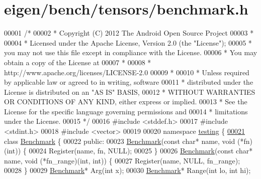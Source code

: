 \hypertarget{eigen_2bench_2tensors_2benchmark_8h_source}{}\section{eigen/bench/tensors/benchmark.h}
\label{eigen_2bench_2tensors_2benchmark_8h_source}

\begin{DoxyCode}
00001 \textcolor{comment}{/*}
00002 \textcolor{comment}{ * Copyright (C) 2012 The Android Open Source Project}
00003 \textcolor{comment}{ *}
00004 \textcolor{comment}{ * Licensed under the Apache License, Version 2.0 (the "License");}
00005 \textcolor{comment}{ * you may not use this file except in compliance with the License.}
00006 \textcolor{comment}{ * You may obtain a copy of the License at}
00007 \textcolor{comment}{ *}
00008 \textcolor{comment}{ *      http://www.apache.org/licenses/LICENSE-2.0}
00009 \textcolor{comment}{ *}
00010 \textcolor{comment}{ * Unless required by applicable law or agreed to in writing, software}
00011 \textcolor{comment}{ * distributed under the License is distributed on an "AS IS" BASIS,}
00012 \textcolor{comment}{ * WITHOUT WARRANTIES OR CONDITIONS OF ANY KIND, either express or implied.}
00013 \textcolor{comment}{ * See the License for the specific language governing permissions and}
00014 \textcolor{comment}{ * limitations under the License.}
00015 \textcolor{comment}{ */}
00016 \textcolor{preprocessor}{#include <stddef.h>}
00017 \textcolor{preprocessor}{#include <stdint.h>}
00018 \textcolor{preprocessor}{#include <vector>}
00019 
00020 \textcolor{keyword}{namespace }\hyperlink{namespacetesting}{testing} \{
\hyperlink{classtesting_1_1_benchmark}{00021} \textcolor{keyword}{class }\hyperlink{classtesting_1_1_benchmark}{Benchmark} \{
00022  \textcolor{keyword}{public}:
00023   \hyperlink{classtesting_1_1_benchmark}{Benchmark}(\textcolor{keyword}{const} \textcolor{keywordtype}{char}* name, \textcolor{keywordtype}{void} (*fn)(\textcolor{keywordtype}{int})) \{
00024     Register(name, fn, NULL);
00025   \}
00026   \hyperlink{classtesting_1_1_benchmark}{Benchmark}(\textcolor{keyword}{const} \textcolor{keywordtype}{char}* name, \textcolor{keywordtype}{void} (*fn\_range)(\textcolor{keywordtype}{int}, \textcolor{keywordtype}{int})) \{
00027     Register(name, NULL, fn\_range);
00028   \}
00029   \hyperlink{classtesting_1_1_benchmark}{Benchmark}* Arg(\textcolor{keywordtype}{int} x);
00030   \hyperlink{classtesting_1_1_benchmark}{Benchmark}* Range(\textcolor{keywordtype}{int} lo, \textcolor{keywordtype}{int} hi);

\end{DoxyCode}
